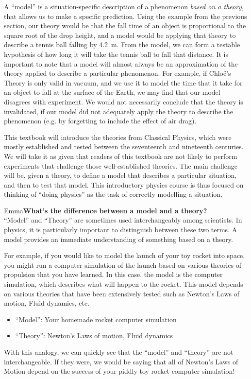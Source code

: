 A ``model'' is a situation-specific description of a phenomenon \textit{based on a theory}, that allows us to make a specific prediction. Using the example from the previous section, our theory would be that the fall time of an object is proportional to the square root of the drop height, and a model would be applying that theory to describe a tennis ball falling by \SI{4.2}{\meter}. From the model, we can form a testable hypothesis of how long it will take the tennis ball to fall that distance. It is important to note that a model will almost always be an approximation of the theory applied to describe a particular phenomenon. For example, if Chlo\"e's Theory is only valid in vacuum, and we use it to model the time that it take for an object to fall at the surface of the Earth, we may find that our model disagrees with experiment. We would not necessarily conclude that the theory is invalidated, if our model did not adequately apply the theory to describe the phenomenon (e.g. by forgetting to include the effect of air drag).

This textbook will introduce the theories from Classical Physics, which were mostly established and tested between the seventeenth and nineteenth centuries. We will take it as given that readers of this textbook are not likely to perform experiments that challenge those well-established theories. The main challenge will be, given a theory, to define a model that describes a particular situation, and then to test that model. This introductory physics course is thus focused on thinking of ``doing physics'' as the task of correctly modelling a situation.

\begin{studentOpinion}{Emma}{\textbf{What's the difference between a model and a theory?}}\\
``Model'' and ``Theory'' are sometimes used interchangeably among scientists. In physics, it is particularly important to distinguish between these two terms. A model provides an immediate understanding of something based on a theory. 

For example, if you would like to model the launch of your toy rocket into space, you might run a computer simulation of the launch based on various theories of propulsion that you have learned. In this case, the model is the computer simulation, which describes what will happen to the rocket. This model depends on various theories that have been extensively tested such as Newton's Laws of motion, Fluid dynamics, etc. 
\begin{itemize}
\item``Model'': Your homemade rocket computer simulation
\item``Theory'': Newton's Laws of motion, Fluid dynamics
\end{itemize}
With this analogy, we can quickly see that the ``model'' and ``theory'' are not interchangeable. If they were, we would be saying that all of Newton's Laws of Motion depend on the success of your piddly toy rocket computer simulation!
\end{studentOpinion}

